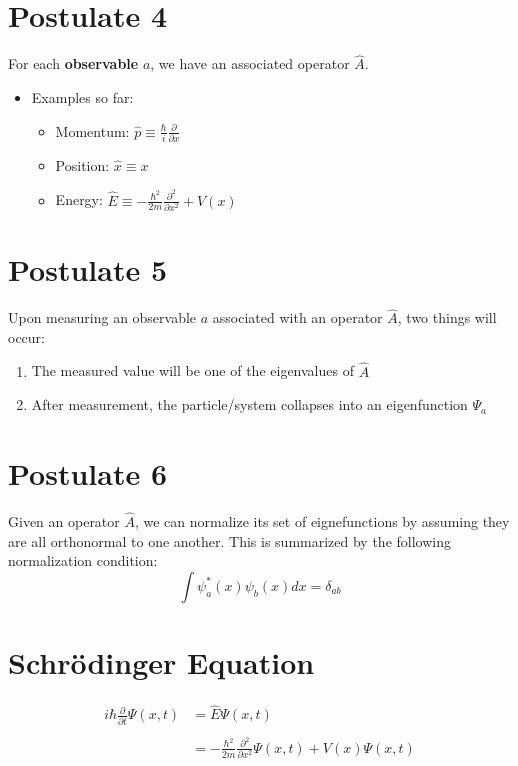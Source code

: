 \documentclass{article}
\begin{document}
\section*{Postulate 4}
For each \textbf{observable} $a$, we have an associated operator $\hat{A}$.
\begin{itemize}
    \item Examples so far:
        \begin{itemize}
            \item Momentum: $\hat{p}\equiv\frac{\hbar}{i}\frac{\partial}{\partial x}$
            \item Position: $\hat{x}\equiv x$
            \item Energy: $\hat{E}\equiv -\frac{\hbar^2}{2m}\frac{\partial^2}{\partial x^2} + V(x)$
        \end{itemize}
\end{itemize}
\section*{Postulate 5}
Upon measuring an observable $a$ associated with an operator $\hat{A}$, two things will occur:
\begin{enumerate}
    \item The measured value will be one of the eigenvalues of $\hat{A}$
    \item After measurement, the particle/system collapses into an eigenfunction $\Psi_a$
\end{enumerate}
\section*{Postulate 6}
Given an operator $\hat{A}$, we can normalize its set of eignefunctions by assuming they are all orthonormal to one another. This is summarized by the following normalization condition:
\begin{equation}
    \int{\psi_a^*(x) \psi_b(x) dx} = \delta_{ab}
\end{equation}
\section*{Schr\"{o}dinger Equation}
\begin{equation}
    \begin{split}
        i\hbar \frac{\partial}{\partial t} \Psi(x,t) & = \hat{E}\Psi(x,t) 
        \\ 
        \\
        & = -\frac{\hbar^2}{2m} \frac{\partial^2}{\partial x^2} \Psi(x,t) + V(x)\Psi(x,t) 
    \end{split}
\end{equation}
\end{document}
